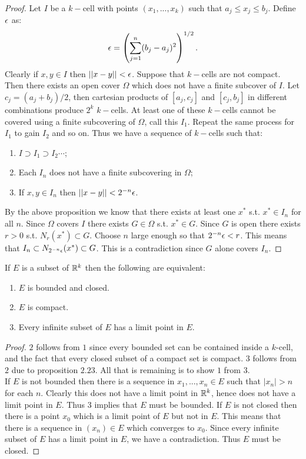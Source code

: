 \begin{proof}
  Let $I$ be a $k-$cell with points $(x_1,...,x_k)$ such that $a_j \leq x_j \leq b_j$. Define $\epsilon$ as:
  \[\epsilon = \left(\sum_{j=1}^n (b_j-a_j)^2\right)^{1/2}.\]
  Clearly if $x,y\in I$ then $||x-y||<\epsilon$. Suppose that $k-$cells are not compact. Then there exists an open cover $\Omega$ which does not have a finite subcover of $I$. Let $c_j = (a_j + b_j)/2$, then cartesian products of $[a_j, c_j]$ and $[c_j,b_j]$ in different combinations produce $2^k$ $k-$cells. At least one of these $k-$cells cannot be covered using a finite subcovering of $\Omega$, call this $I_1$. Repeat the same process for $I_1$ to gain $I_2$ and so on. Thus we have a sequence of $k-$cells such that:
  \begin{enumerate}
    \item $I\supset I_1 \supset I_2 \cdots$;
    \item Each $I_n$ does not have a finite subcovering in $\Omega$;
    \item If $x,y\in I_n$ then $||x-y|| < 2^{-n}\epsilon$.
  \end{enumerate}
  By the above proposition we know that there exists at least one $x^*$ s.t. $x^*\in I_n$ for all $n$. Since $\Omega$ covers $I$ there exists $G\in \Omega$ s.t. $x^*\in G$. Since $G$ is open there exists $r>0$ s.t. $N_r(x^*)\subset G$. Choose $n$ large enough so that $2^{-n}\epsilon < r$. This means that $I_n \subset N_{2^{-n}\epsilon}(x^*) \subset G$. This is a contradiction since $G$ alone covers $I_n$.
\end{proof}
\begin{theorem}
  If $E$ is a subset of $\mathbb{R}^k$ then the following are equivalent:
  \begin{enumerate}
    \item $E$ is bounded and closed.
    \item $E$ is compact.
    \item Every infinite subset of $E$ has a limit point in $E$.
  \end{enumerate}
\end{theorem}
\begin{proof}
  $2$ follows from $1$ since every bounded set can be contained inside a $k$-cell, and the fact that every closed subset of a compact set is compact. $3$ follows from $2$ due to proposition $2.23$. All that is remaining is to show $1$ from $3$.\\
  If $E$ is not bounded then there is a sequence in $x_1,...,x_n\in E$ such that $|x_n| > n$ for each $n$. Clearly this does not have a limit point in $\mathbb{R}^k$, hence does not have a limit point in $E$. Thus 3 implies that $E$ must be bounded. If $E$ is not closed then there is a point $x_0$ which is a limit point of $E$ but not in $E$. This means that there is a sequence in $(x_n)\in E$ which converges to $x_0$. Since every infinite subset of $E$ has a limit point in $E$, we have a contradiction. Thus $E$ must be closed.
\end{proof}
